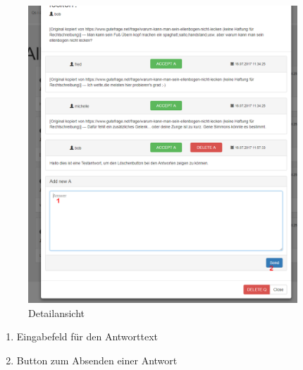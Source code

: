 \documentclass[a4paper]{report}
\begin{document}
\begin{figure}[h!]
	\centering
	\includegraphics[width=0.9\textwidth]{FrageMitAntwortenUndAntwortfeld.PNG}
	\caption{Detailansicht}
	\label{fig:Detailansicht2}
\end{figure}
\centering\begin{enumerate}	 
	\item Eingabefeld für den Antworttext
	\item Button zum Absenden einer Antwort
\end{enumerate}
\newpage
\end{document}
